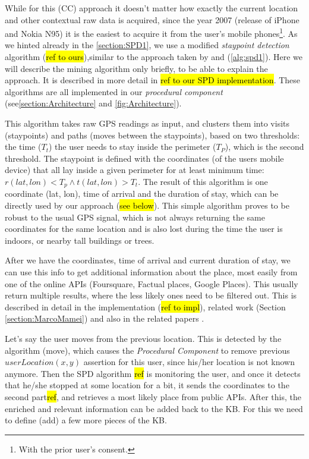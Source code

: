 While for this (CC) approach it doesn't matter how exactly the current location
and other contextual raw data is acquired, since the year 2007 (release of 
iPhone and Nokia N95) it is the easiest to acquire it from the user's mobile 
phones\footnote{With the prior user's consent.}. As we hinted already in the
\autoref{section:SPD1}, we use a modified \emph{staypoint detection} algorithm
(\hl{ref to ours}),similar to the approach taken by \textcite{Kang2005} and 
\textcite{Li2008}(\autoref{alg:spd1}). Here we will describe the mining 
algorithm only briefly, to be able to explain the approach. It is described in
more detail in \hl{ref to our SPD implementation}. These algorithms are all
implemented in our \emph{procedural component} 
(see\autoref{section:Architecture} and \autoref{fig:Architecture}).

This algorithm takes raw GPS readings as input, and clusters them into visits
(staypoints) and paths (moves between the staypoints), based on two thresholds:
the time ($T_t$) the user needs to stay
inside the perimeter ($T_P$), which is the second threshold. The staypoint is 
defined with the coordinates (of the users mobile device) that all lay inside a
given perimeter for at least minimum time: 
$r(lat,lon)<T_p \land t(lat,lon)>T_t$. The result of this algorithm is one
coordinate (lat, lon), time of arrival and the duration of stay, which can be
directly used by our approach (\hl{see below}). This simple algorithm proves 
to be robust to the usual GPS signal, which is not always returning the same 
coordinates for the same location and is also lost during the time the user is
indoors, or nearby tall buildings or trees. 

After we have the coordinates, time of arrival and current duration of stay,
we can use this info to get additional information about the place, most easily
from one of the online APIs (Foursquare, Factual places, Google Places). This
usually return multiple results, where the less likely ones need to be filtered
out. This is described in detail in the implementation (\hl{ref to impl}), 
related work (Section \ref{section:MarcoMamei}) and also in the related papers 
\autocite{Mamei2010,Bradesko2015}.

Let's say the user moves from the previous location. This is detected by the
algorithm (move), which causes the \emph{Procedural Component} to remove 
previous $userLocation(x,y)$ assertion for this user, since his/her location is
not known anymore. Then the SPD algorithm \hl{ref} is monitoring the user, and 
once it detects that he/she stopped at some location for a bit, it sends the 
coordinates to the second part\hl{ref}, and retrieves a most likely place from 
public APIs. After this, the enriched and relevant information can be added 
back to the KB. For this we need to define (add) a few more pieces of the KB.

